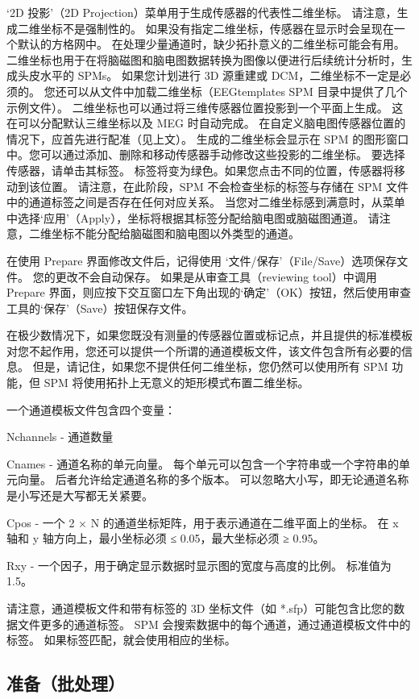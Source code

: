 ‘2D 投影’（2D Projection）菜单用于生成传感器的代表性二维坐标。
请注意，生成二维坐标不是强制性的。
如果没有指定二维坐标，传感器在显示时会呈现在一个默认的方格网中。
在处理少量通道时，缺少拓扑意义的二维坐标可能会有用。
二维坐标也用于在将脑磁图和脑电图数据转换为图像以便进行后续统计分析时，生成头皮水平的 SPMs。
如果您计划进行 3D 源重建或 DCM，二维坐标不一定是必须的。
您还可以从文件中加载二维坐标（EEGtemplates SPM 目录中提供了几个示例文件）。
二维坐标也可以通过将三维传感器位置投影到一个平面上生成。
这在可以分配默认三维坐标以及 MEG 时自动完成。
在自定义脑电图传感器位置的情况下，应首先进行配准（见上文）。
生成的二维坐标会显示在 SPM 的图形窗口中。您可以通过添加、删除和移动传感器手动修改这些投影的二维坐标。
要选择传感器，请单击其标签。
标签将变为绿色。如果您点击不同的位置，传感器将移动到该位置。
请注意，在此阶段，SPM 不会检查坐标的标签与存储在 SPM 文件中的通道标签之间是否存在任何对应关系。
当您对二维坐标感到满意时，从菜单中选择‘应用’（Apply），坐标将根据其标签分配给脑电图或脑磁图通道。
请注意，二维坐标不能分配给脑磁图和脑电图以外类型的通道。


在使用 Prepare 界面修改文件后，记得使用 ‘文件/保存’（File/Save）选项保存文件。
您的更改不会自动保存。
如果是从审查工具（reviewing tool）中调用 Prepare 界面，则应按下交互窗口左下角出现的‘确定’（OK）按钮，然后使用审查工具的‘保存’（Save）按钮保存文件。


在极少数情况下，如果您既没有测量的传感器位置或标记点，并且提供的标准模板对您不起作用，您还可以提供一个所谓的通道模板文件，该文件包含所有必要的信息。
但是，请记住，如果您不提供任何二维坐标，您仍然可以使用所有 SPM 功能，但 SPM 将使用拓扑上无意义的矩形模式布置二维坐标。


一个通道模板文件包含四个变量：

Nchannels - 通道数量

Cnames - 通道名称的单元向量。
每个单元可以包含一个字符串或一个字符串的单元向量。
后者允许给定通道名称的多个版本。
可以忽略大小写，即无论通道名称是小写还是大写都无关紧要。

Cpos - 一个 2 × N 的通道坐标矩阵，用于表示通道在二维平面上的坐标。
在 x 轴和 y 轴方向上，最小坐标必须 ≤ 0.05，最大坐标必须 ≥ 0.95。

Rxy - 一个因子，用于确定显示数据时显示图的宽度与高度的比例。
标准值为 1.5。


请注意，通道模板文件和带有标签的 3D 坐标文件（如 *.sfp）可能包含比您的数据文件更多的通道标签。
SPM 会搜索数据中的每个通道，通过通道模板文件中的标签。
如果标签匹配，就会使用相应的坐标。


\subsection{准备（批处理）}

